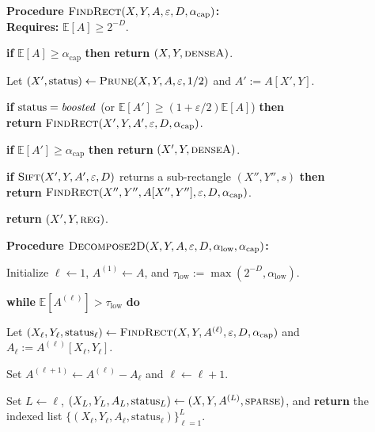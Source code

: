 \documentclass[11pt]{article}
\theoremstyle{definition}
\renewcommand{\label}[1]{}%
\newcommand{\E}{\mathbb{E}}
\newcommand{\dens}[1]{\E[#1]}
\newcommand{\Prune}{\textnormal{\textsc{Prune}}}
\newcommand{\Sift}{\textnormal{\textsc{Sift}}}
\newcommand{\FindRect}{\textnormal{\textsc{FindRect}}}
\newcommand{\DecomposeTwoD}{\textnormal{\textsc{Decompose2D}}}
\newcommand{\tagreg}{\textnormal{\textsc{reg}}}
\newcommand{\tagdenseA}{\textnormal{\textsc{denseA}}}
\newcommand{\tagsparse}{\textnormal{\textsc{sparse}}}
\begin{document}
\begin{algorithm}[t]
\caption{$\FindRect(X, Y, A, \varepsilon, D, \alpha_{\text{cap}})$ and $\DecomposeTwoD(X, Y, A, \varepsilon, D, \alpha_{\text{low}}, \alpha_{\text{cap}})$}\label{alg:2d}
\textbf{Procedure $\FindRect(X, Y, A, \varepsilon, D, \alpha_{\text{cap}})$:}\\
\textbf{Requires:} $\dens{A} \ge 2^{-D}$.
\begin{algsteps}
    \item \textbf{if} $\dens{A} \ge \alpha_{\text{cap}}$ \textbf{then return} $(X, Y, \tagdenseA)$.\label{line:findrect-cap1}
    \item Let $(X', \text{status}) \gets \Prune(X, Y, A, \varepsilon, 1/2)$ and $A' := A[X', Y]$.\label{line:findrect-prune}
    \item \textbf{if} $\text{status} = \text{\emph{boosted}}$ (or $\dens{A'} \ge (1 + \varepsilon/2)\dens{A}$) \textbf{then}\\
    \quad \textbf{return} $\FindRect(X', Y, A', \varepsilon, D, \alpha_{\text{cap}})$.\label{line:findrect-rec1}
    \item \textbf{if} $\dens{A'} \ge \alpha_{\text{cap}}$ \textbf{then return} $(X', Y, \tagdenseA)$.\label{line:findrect-cap2}
    \item \textbf{if} $\Sift(X', Y, A', \varepsilon, D)$ returns a sub-rectangle $(X'', Y'', s)$ \textbf{then}\\
    \quad \textbf{return} $\FindRect(X'', Y'', A[X'', Y''], \varepsilon, D, \alpha_{\text{cap}})$.\label{line:findrect-sift}
    \item \textbf{return} $(X', Y, \tagreg)$.\label{line:findrect-reg}
\end{algsteps}
\vspace{4pt}
\textbf{Procedure $\DecomposeTwoD(X, Y, A, \varepsilon, D, \alpha_{\text{low}}, \alpha_{\text{cap}})$:}
\begin{algsteps}[resume]
    \item Initialize $\ell \gets 1$, $A^{(1)} \gets A$, and $\tau_{\text{low}} := \max(2^{-D}, \alpha_{\text{low}})$.\label{line:dec2d-init}
    \item \textbf{while} $\dens{A^{(\ell)}} > \tau_{\text{low}}$ \textbf{do}\label{line:dec2d-while}
    \item \quad Let $(X_\ell, Y_\ell, \text{status}_\ell) \gets \FindRect(X, Y, A^{(\ell)}, \varepsilon, D, \alpha_{\text{cap}})$ and $A_\ell := A^{(\ell)}[X_\ell, Y_\ell]$.\label{line:dec2d-call}
    \item \quad Set $A^{(\ell+1)} \gets A^{(\ell)} - A_\ell$ and $\ell \gets \ell + 1$.\label{line:dec2d-sub}
    \item Set $L \gets \ell$, $(X_L, Y_L, A_L, \text{status}_L) \gets (X, Y, A^{(L)}, \tagsparse)$, and \textbf{return} the indexed list $\{(X_\ell, Y_\ell, A_\ell, \text{status}_\ell)\}_{\ell=1}^L$.\label{line:dec2d-ret}
\end{algsteps}
\end{algorithm}
\end{document}
